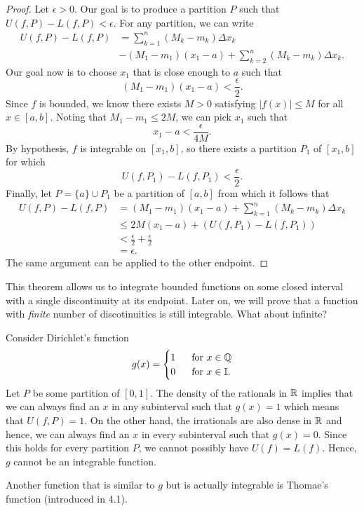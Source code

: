 \begin{proof}
Let \( \epsilon > 0  \). Our goal is to produce a partition \( P  \) such that \( U(f, P ) - L(f, P ) < \epsilon. \) For any partition, we can write 
\begin{align*}
    U(f, P ) - L(f,P ) &= \sum_{ k=1 }^{ n } (M_{k } - m_{k } ) \Delta x_{ k } \\
					   &- (M_{1} - m_{1})(x_{1} - a) + \sum_{ k=2 }^{ n } (M_{k} - m_{ k }) \Delta x_{k }.
\end{align*}
Our goal now is to choose \( x_{1} \) that is close enough to \( a \) such that 
\[  (M_{1} - m_{1})(x_{1} - a ) < \frac{ \epsilon  }{ 2 }. \] Since \( f  \) is bounded, we know there exists \( M > 0  \) satisfying \( | f(x)  | \leq M  \) for all \( x \in [a,b]  \). Noting that \( M_{1} - m_{1} \leq 2M \), we can pick \( x_{1} \) such that 
\[  x_{1} - a < \frac{ \epsilon  }{ 4 M  }. \] By hypothesis, \( f  \) is integrable on \( [x_{1}, b ] \), so there exists a partition \( P_{1}  \) of \( [x_{1}, b] \) for which 
\[  U(f, P_{1}) - L(f, P_{1}) < \frac{ \epsilon  }{ 2 }. \] Finally, let \( P = \{ a \} \cup P_{1} \) be a partition of \(  [a,b]  \) from which it follows that 
\begin{align*}
    U(f,P) - L(f,P) &= (M_{1} - m_{1})(x_{1} - a ) + \sum_{ k=1 }^{ n } (M_{k } - m_{k }) \Delta x_{k } \\
					&\leq 2M ( x_{1} - a ) + (U(f, P_{1}) - L(f,P_{1})) \\
					&< \frac{ \epsilon  }{ 2 }  + \frac{ \epsilon  }{ 2  } \\
					&= \epsilon.
\end{align*}
The same argument can be applied to the other endpoint.
\end{proof}

This theorem allows us to integrate bounded functions on some closed interval with a single discontinuity at its endpoint. Later on, we will prove that a function with \textit{finite} number of discotinuities is still integrable. What about infinite? 

\begin{example}{}{}
Consider Dirichlet's function 
\[  g(x) = 
\begin{cases}
	1 \ &\text{ for } x \in \mathbb{Q} \\
	0 \ &\text{ for } x \in \mathbb{I}.
\end{cases}  \]
Let \( P  \) be some partition of \( [0,1]  \). The density of the rationals in \( \mathbb{R}  \) implies that we can always find an \( x   \) in any subinterval such that \( g(x) = 1  \) which means that \( U(f,P) = 1  \). On the other hand, the irrationals are also dense in \( \mathbb{R}  \) and hence, we can always find an \( x  \) in every subinterval such that \( g(x) = 0  \). Since this holds for every partition \( P  \), we cannot possibly have \( U(f) = L(f)   \). Hence, \( g  \) cannot be an integrable function.
\end{example}

Another function that is similar to \( g  \) but is actually integrable is Thomae's function (introduced in 4.1).  


